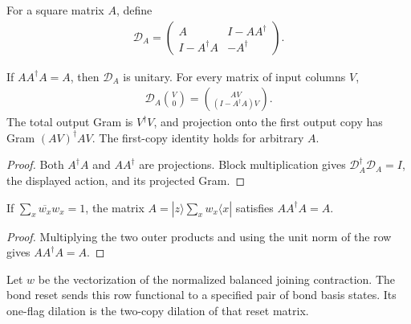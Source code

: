 \begin{definition}
    \label{def:mpu_partial_isometry_dilation}
    \leanok
    For a square matrix $A$, define
    \begin{align}
        \mathcal D_A=
        \begin{pmatrix}
            A             & I-AA^\dagger \\
            I-A^\dagger A & -A^\dagger
        \end{pmatrix}.
    \end{align}
\end{definition}

\begin{lemma}
    \label{thm:mpu_partial_isometry_dilation}
    \leanok
    If $AA^\dagger A=A$, then $\mathcal D_A$ is unitary. For every
    matrix of input columns $V$,
    \begin{align}
        \mathcal D_A\binom V0=
        \binom{AV}{(I-A^\dagger A)V}.
    \end{align}
    The total output Gram is $V^\dagger V$, and projection onto
    the first output copy has Gram $(AV)^\dagger AV$.
    The first-copy identity holds for arbitrary $A$.
\end{lemma}
\begin{proof}\leanok
    Both $A^\dagger A$ and $AA^\dagger$ are projections.
    Block multiplication gives $\mathcal D_A^\dagger\mathcal D_A=I$,
    the displayed action, and its projected Gram.
\end{proof}

\begin{lemma}
    \label{thm:mpu_normalized_row_reset}
    \leanok
    If $\sum_x\overline{w_x}w_x=1$, the matrix
    $A=|z\rangle\sum_xw_x\langle x|$ satisfies
    $AA^\dagger A=A$.
\end{lemma}
\begin{proof}\leanok
    Multiplying the two outer products and using the unit norm of the row gives $AA^\dagger A=A$.
\end{proof}

\begin{definition}
    \label{def:mpu_normalized_bond_dilation}
    \leanok
    Let $w$ be the vectorization of the normalized balanced joining
    contraction. The bond reset sends this row functional to a
    specified pair of bond basis states. Its one-flag dilation
    is the two-copy dilation of that reset matrix.
\end{definition}


